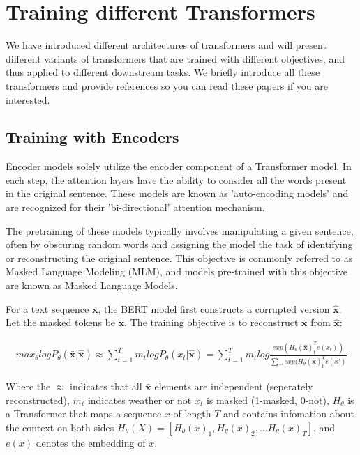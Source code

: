 \section{Training different Transformers}
We have introduced different architectures of transformers and will present different variants of transformers that are trained with different objectives, and thus applied to different downstream tasks. We briefly introduce all these transformers and provide references so you can read these papers if you are interested.

\subsection{Training with Encoders}
Encoder models solely utilize the encoder component of a Transformer model. In each step, the attention layers have the ability to consider all the words present in the original sentence. These models are known as 'auto-encoding models' and are recognized for their 'bi-directional' attention mechanism.

The pretraining of these models typically involves manipulating a given sentence, often by obscuring random words and assigning the model the task of identifying or reconstructing the original sentence. This objective is commonly referred to as Masked Language Modeling (MLM), and models pre-trained with this objective are known as Masked Language Models.

For a text sequence $\textbf{x}$, the BERT model first constructs a corrupted version $\hat{\textbf{x}}$. Let the masked tokens be $\bar{\textbf{x}}$. The training objective is to reconstruct $\bar{\textbf{x}}$ from $\hat{\textbf{x}}$:

\begin{align}
max_{\theta}logP_{\theta}(\bar{\textbf{x}}|\hat{\textbf{x}})\approx \sum_{t=1}^Tm_tlogP_{\theta}(x_t|\hat{\textbf{x}})
=\sum_{t=1}^Tm_tlog\frac{exp(H_{\theta}(\hat{\textbf{x}})_t^Te(x_t))}{\sum_{x\prime} {exp(H_{\theta}(\hat{\textbf{x}})_t^Te(x\prime)}}
\end{align}

Where the $\approx$ indicates that all $\bar{\textbf{x}}$ elements are independent (seperately reconstructed), $m_t$ indicates weather or not $x_t$ is masked (1-masked, 0-not), $H_{\theta}$ is a Transformer that maps a sequence $x$ of length $T$ and contains infomation about the context on both sides $H_{\theta}(X)=[H_{\theta}(x)_1, H_{\theta}(x)_2,...H_{\theta}(x)_T]$, and $e(x)$ denotes the embedding of $x$.


